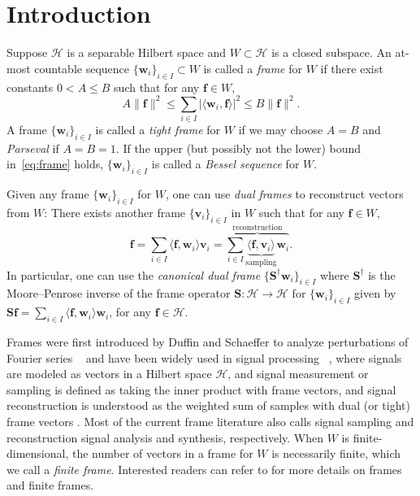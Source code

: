 \documentclass{amsart}
\numberwithin{equation}{section}
\theoremstyle{plain}
\theoremstyle{remark}
\theoremstyle{definition}
\begin{document}
\section{Introduction}
Suppose $\mathcal{H}$ is a separable Hilbert space and $W \subset \mathcal{H}$ is a closed subspace. An at-most countable sequence $\{\mathbf{w}_i\}_{i \in I} \subset W$ is called a \emph{frame} for $W$ if there exist constants $0<A \leq B $ such that for any $\mathbf{f} \in W$, 
\begin{equation}\label{eq:frame}
    A \|\mathbf{f}\|^2 \leq \sum_{i\in I} |\langle \mathbf{w}_i, \mathbf{f} \rangle|^2 \leq B \|\mathbf{f}\|^2.
\end{equation}
A frame $\{\mathbf{w}_i\}_{i \in I}$ is called a \emph{tight frame} for $W$ if we may choose $A=B$ and \emph{Parseval} if $A=B=1$. If the upper (but possibly not the lower) bound in~\eqref{eq:frame} holds, $\{\mathbf{w}_i\}_{i \in I}$ is called a \emph{Bessel sequence} for $W$. 


Given any frame $\{\mathbf{w}_i\}_{i\in I}$ for $W$, one can use \emph{dual frames} to reconstruct vectors from $W$: There exists another frame $\{\mathbf{v}_i\}_{i\in I}$ in $W$ such that for any $\mathbf{f} \in W$, 
\begin{equation}\label{eq:dualframe}
    \mathbf{f} = \sum_{i\in I} \langle \mathbf{f}, \mathbf{w}_i \rangle \mathbf{v}_i = \overbrace{\sum_{i\in I} \underbrace{\langle \mathbf{f}, \mathbf{v}_i \rangle}_{\text{sampling}} \mathbf{w}_i}^{\text{reconstruction}}.
\end{equation}
In particular, one can use the \emph{canonical dual frame} $ \{\mathbf{S}^\dagger\mathbf{w}_i\}_{i\in I}$ where  $\mathbf{S}^\dagger$ is the Moore–Penrose inverse of the frame operator $\mathbf{S}: \mathcal{H} \rightarrow \mathcal{H}$ for $\{\mathbf{w}_i\}_{i\in I}$ given by $ \mathbf{S} \mathbf{f} = \sum_{i\in I} \langle \mathbf{f}, \mathbf{w}_i \rangle \mathbf{w}_i$, for any $\mathbf{f} \in \mathcal{H}$. 

Frames were first introduced by Duffin and Schaeffer to analyze perturbations
of Fourier series ~\cite{duffin1952class} and have been widely used in signal processing ~\cite{daubechies1992ten, grochenig2001foundations,  strohmer2003grassmannian, kutyniok2012multiscale, naidu2020construction}, where signals are modeled as vectors in a Hilbert space $\mathcal{H}$, and signal measurement or sampling is defined as taking the inner product with frame vectors, and signal reconstruction is understood as the weighted sum of samples with dual (or tight) frame vectors \cite{eldar2005general}. 
Most of the current frame literature also calls signal sampling and reconstruction signal analysis and synthesis, respectively. When $W$ is finite-dimensional, the number of vectors in a frame for $W$ is necessarily finite, which we call a \emph{finite frame}. 
Interested readers can refer to \cite{christensen2016introduction, waldron2018introduction} for more details on frames and finite frames. 
\end{document}
